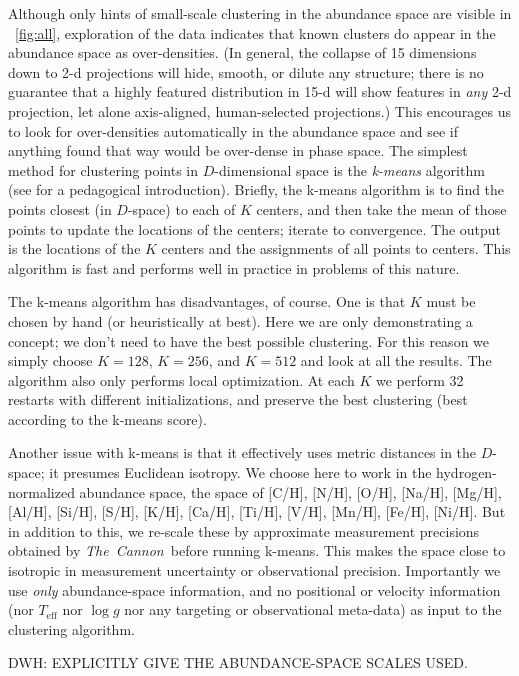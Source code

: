 \documentclass[12pt, letterpaper, preprint]{aastex}
\newcommand{\project}[1]{\textsl{#1}}
\newcommand{\thecannon}{\project{The~Cannon}}
\newcommand{\teff}{T_{\mathrm{eff}}}
\newcommand{\logg}{\log g}
\begin{document}
Although only hints of small-scale clustering in the abundance space
are visible in \figurename~\ref{fig:all}, exploration of the data indicates that
known clusters do appear in the abundance space as over-densities.
(In general, the collapse of 15 dimensions down to 2-d projections
will hide, smooth, or dilute any structure; there is no guarantee that
a highly featured distribution in 15-d will show features in
\emph{any} 2-d projection, let alone axis-aligned, human-selected projections.)
This encourages us to look for over-densities automatically in the
abundance space and see if anything found that way would be over-dense
in phase space.
The simplest method for clustering points in $D$-dimensional space is
the \emph{k-means} algorithm (see \citealt{bishop} for a pedagogical introduction).
Briefly, the k-means algorithm is to find the points closest (in
$D$-space) to each of $K$ centers, and then take the mean of those
points to update the locations of the centers; iterate to convergence.
The output is the locations of the $K$ centers and the assignments of
all points to centers.
This algorithm is fast and performs well in practice in problems of
this nature.

The k-means algorithm has disadvantages, of course.
One is that $K$ must be chosen by hand (or heuristically at best).
Here we are only demonstrating a concept; we don't need to have the
best possible clustering.
For this reason we simply choose $K=128$, $K=256$, and $K=512$ and look at all the
results.
The algorithm also only performs local optimization.
At each $K$ we perform 32 restarts with different initializations, and
preserve the best clustering (best according to the k-means score).

Another issue with k-means is that it effectively uses metric
distances in the $D$-space; it presumes Euclidean isotropy.
We choose here to work in the hydrogen-normalized abundance space, the
space of [C/H], [N/H], [O/H], [Na/H], [Mg/H], [Al/H], [Si/H], [S/H],
[K/H], [Ca/H], [Ti/H], [V/H], [Mn/H], [Fe/H], [Ni/H].
But in addition to this, we re-scale these by approximate measurement
precisions obtained by \thecannon\ before running k-means.
This makes the space close to isotropic in measurement uncertainty or
observational precision.
Importantly we use \emph{only} abundance-space information, and no
positional or velocity information (nor $\teff$ nor $\logg$ nor any
targeting or observational meta-data) as input to the clustering
algorithm.

DWH: EXPLICITLY GIVE THE ABUNDANCE-SPACE SCALES USED.
\end{document}
